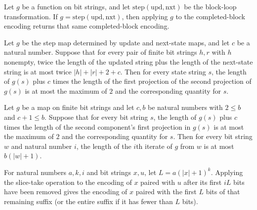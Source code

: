 \begin{theorem}
\label{Complexity.BlockLoop.step_done}
\leanok
{}
Let $g$ be a function on bit strings, and let $\mathrm{step}(\mathrm{upd},\mathrm{nxt})$
be the block-loop transformation. If $g=\mathrm{step}(\mathrm{upd},\mathrm{nxt})$, then
applying $g$ to the completed-block encoding returns that same completed-block encoding.
\end{theorem}

\begin{theorem}
\label{Complexity.BlockLoop.length_step_le}
\leanok
{}
Let $g$ be the step map determined by update and next-state maps, and let $c$ be a
natural number. Suppose that for every pair of finite bit strings $h,r$ with $h$
nonempty, twice the length of the updated string plus the length of the next-state
string is at most twice $|h|+|r|+2+c$. Then for every state string $s$, the length of
$g(s)$ plus $c$ times the length of the first projection of the second projection of
$g(s)$ is at most the maximum of $2$ and the corresponding quantity for $s$.
\end{theorem}

\begin{theorem}
\label{Complexity.BlockLoop.length_iterate_le_of_slack}
\leanok
{}
Let $g$ be a map on finite bit strings and let $c,b$ be natural numbers with $2\le b$
and $c+1\le b$. Suppose that for every bit string $s$, the length of $g(s)$ plus $c$
times the length of the second component's first projection in $g(s)$ is at most the
maximum of $2$ and the corresponding quantity for $s$. Then for every bit string $w$ and
natural number $i$, the length of the $i$th iterate of $g$ from $w$ is at most
$b(|w|+1)$.
\end{theorem}

\begin{theorem}
\label{Complexity.BlockLoop.sliceTakeAt_pairEncode_drop}
\leanok
{}
For natural numbers $a,k,i$ and bit strings $x,u$, let $L=a(|x|+1)^k$. Applying the
slice-take operation to the encoding of $x$ paired with $u$ after its first $iL$ bits
have been removed gives the encoding of $x$ paired with the first $L$ bits of that
remaining suffix (or the entire suffix if it has fewer than $L$ bits).
\end{theorem}


